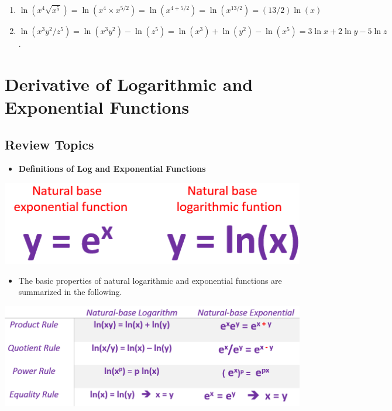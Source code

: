 \documentclass[
]{book}
\providecommand{\tightlist}{%
  \setlength{\itemsep}{0pt}\setlength{\parskip}{0pt}}
\begin{document}
\begin{enumerate}
\def\labelenumi{\arabic{enumi}.}
\item
  \(\ln(x^4\sqrt{x^5}) = \ln(x^4 \times x^{5/2}) = \ln(x^{4+5/2}) = \ln(x^{13/2}) = (13/2)\ln(x)\)
\item
  \(\ln(x^3y^2/z^5) = \ln(x^3y^2) -\ln(z^5) = \ln(x^3) + \ln(y^2) - \ln(x^5) = 3\ln x+2\ln y -5\ln z\).
\end{enumerate}

\hypertarget{derivative-of-logarithmic-and-exponential-functions}{%
\chapter{Derivative of Logarithmic and Exponential Functions}\label{derivative-of-logarithmic-and-exponential-functions}}

\hypertarget{review-topics}{%
\section{Review Topics}\label{review-topics}}

\begin{itemize}
\tightlist
\item
  \textbf{Definitions of Log and Exponential Functions}
\end{itemize}

\begin{center}\includegraphics[width=0.4\linewidth]{img05/w05-ExpLogNaturalComparison} \end{center}

\begin{itemize}
\tightlist
\item
  The basic properties of natural logarithmic and exponential functions are summarized in the following.
\end{itemize}

\begin{center}\includegraphics[width=0.7\linewidth]{img05/w05-NaturalExpLogProperties} \end{center}
\end{document}
